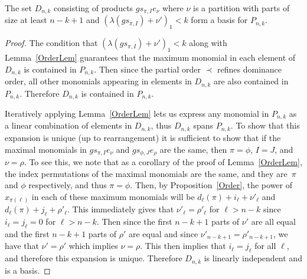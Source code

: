 \documentclass[10pt]{article}
\begin{document}
\begin{prop}
\label{BasisProp}

	The set $D_{n,k}$ consisting of products $gs_{\pi,I}e_\nu$ where $\nu$ is a partition with parts of size at least $n-k+1$ 
and $(\lambda(gs_{\pi,I})+\nu')_1<k$ form a basis for $P_{n,k}$.
	\begin{proof}

The condition that $(\lambda(gs_{\pi,I})+\nu')_1<k$ along with Lemma~\ref{OrderLem} guarantees that the maximum monomial in 
each element of $D_{n,k}$ is contained in $P_{n,k}$. Then since the partial order $\prec$ refines dominance order, all other 
monomials appearing in elements in $D_{n,k}$ are also contained in $P_{n,k}$. Therefore $D_{n,k}$ is contained in $P_{n,k}$. 

Iteratively applying Lemma~\ref{OrderLem} lets us express any monomial in $P_{n,k}$ as a linear combination of elements in 
$D_{n,k}$, thus $D_{n,k}$ spans $P_{n,k}$. To show that this expansion is unique (up to rearrangement) it is sufficient to 
show that if the maximal monomials in $gs_{\pi,I}e_{\nu}$ and $gs_{\phi,J}e_{\rho}$ are the same, then $\pi=\phi$, $I=J$, and 
$\nu=\rho$. To see this, we note that as a corollary of the proof of Lemma~\ref{OrderLem}, the index permutations of the 
maximal monomials are the same, and they are~$\pi$ and $\phi$ respectively, and thus $\pi=\phi$. Then, by Proposition~\ref{Order}, the power of $x_{\pi(\ell)}$ in each of these maximum monomials will be $d_\ell(\pi)+i_\ell+\nu'_\ell$ and 
$d_\ell(\pi)+j_\ell+\rho'_\ell$. This immediately gives that $\nu'_\ell=\rho'_\ell$ for $\ell>n-k$ since $i_\ell=j_\ell=0$ for 
$\ell>n-k$. Then since the first $n-k+1$ parts of $\nu'$ are all equal and the first $n-k+1$ parts of $\rho'$ are equal and 
since $\nu'_{n-k+1}=\rho'_{n-k+1}$, we have that $\nu'=\rho'$ which implies $\nu=\rho$. This then implies that $i_\ell=j_\ell$ 
for all $\ell$, and therefore this expansion is unique. Therefore $D_{n,k}$ is linearly independent and is a basis.
	\end{proof}

\end{prop}
\end{document}
